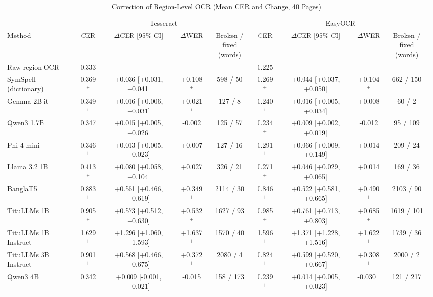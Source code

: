 \begin{table}[t]
\centering
\caption{Correction of Region-Level OCR (Mean CER and Change, 40 Pages)}
\label{tab:region}
\setlength{\tabcolsep}{4pt}
\footnotesize
\begin{tabular}{lcccccccc}
\toprule
 & \multicolumn{4}{c}{Tesseract} & \multicolumn{4}{c}{EasyOCR} \\
\cmidrule(lr){2-5}\cmidrule(lr){6-9}
Method & CER & $\Delta$CER [95\% CI] & $\Delta$WER & \shortstack{Broken /\\fixed (words)} & CER & $\Delta$CER [95\% CI] & $\Delta$WER & \shortstack{Broken /\\fixed (words)} \\
\midrule
Raw region OCR & 0.333 &  &  &  & 0.225 &  &  &  \\
\midrule
SymSpell (dictionary) & 0.369$^{+}$ & +0.036 [+0.031, +0.041] & +0.108$^{+}$ & 598 / 50 & 0.269$^{+}$ & +0.044 [+0.037, +0.050] & +0.104$^{+}$ & 662 / 150 \\
Gemma-2B-it & 0.349$^{+}$ & +0.016 [+0.006, +0.031] & +0.021$^{+}$ & 127 / 8 & 0.240$^{+}$ & +0.016 [+0.005, +0.034] & +0.008 & 60 / 2 \\
Qwen3 1.7B & 0.347 & +0.015 [+0.005, +0.026] & -0.002 & 125 / 57 & 0.234$^{+}$ & +0.009 [+0.002, +0.019] & -0.012 & 95 / 109 \\
Phi-4-mini & 0.346$^{+}$ & +0.013 [+0.005, +0.023] & +0.007 & 127 / 16 & 0.291$^{+}$ & +0.066 [+0.009, +0.149] & +0.014 & 209 / 24 \\
Llama 3.2 1B & 0.413$^{+}$ & +0.080 [+0.058, +0.104] & +0.027 & 326 / 21 & 0.271$^{+}$ & +0.046 [+0.029, +0.065] & +0.014 & 169 / 36 \\
BanglaT5 & 0.883$^{+}$ & +0.551 [+0.466, +0.619] & +0.349$^{+}$ & 2114 / 30 & 0.846$^{+}$ & +0.622 [+0.581, +0.665] & +0.490$^{+}$ & 2103 / 90 \\
TituLLMs 1B & 0.905$^{+}$ & +0.573 [+0.512, +0.630] & +0.532$^{+}$ & 1627 / 93 & 0.985$^{+}$ & +0.761 [+0.713, +0.803] & +0.685$^{+}$ & 1619 / 101 \\
TituLLMs 1B Instruct & 1.629$^{+}$ & +1.296 [+1.060, +1.593] & +1.637$^{+}$ & 1570 / 40 & 1.596$^{+}$ & +1.371 [+1.228, +1.516] & +1.622$^{+}$ & 1739 / 36 \\
TituLLMs 3B Instruct & 0.901$^{+}$ & +0.568 [+0.466, +0.675] & +0.372$^{+}$ & 2080 / 4 & 0.824$^{+}$ & +0.599 [+0.520, +0.667] & +0.308$^{+}$ & 2000 / 2 \\
Qwen3 4B & 0.342 & +0.009 [-0.001, +0.021] & -0.015 & 158 / 173 & 0.239$^{+}$ & +0.014 [+0.005, +0.023] & -0.030$^{-}$ & 121 / 217 \\

\end{tabular}
\end{table}
